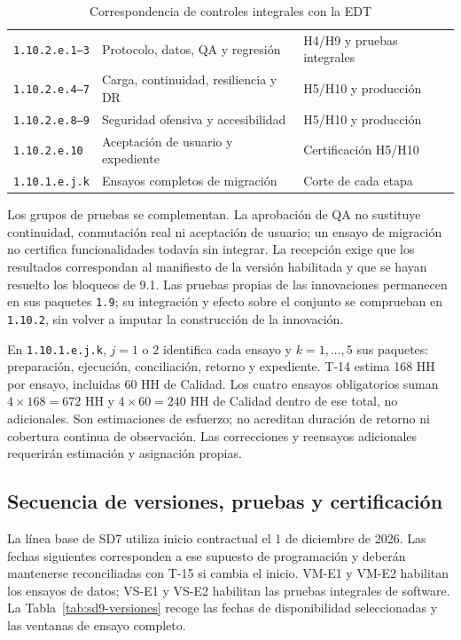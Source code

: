 \begin{table}[htbp]
\centering
\caption{Correspondencia de controles integrales con la EDT}
\label{tab:sd9-edt-calidad}
\small
\begin{tabularx}{\textwidth}{L{.22\textwidth}Y L{.26\textwidth}}
\hline
{} &  &  \\\hline
\texttt{1.10.2.e.1--3} & Protocolo, datos, QA y regresión & H4/H9 y pruebas integrales \\\hline
\texttt{1.10.2.e.4--7} & Carga, continuidad, resiliencia y DR & H5/H10 y producción \\\hline
\texttt{1.10.2.e.8--9} & Seguridad ofensiva y accesibilidad & H5/H10 y producción \\\hline
\texttt{1.10.2.e.10} & Aceptación de usuario y expediente & Certificación H5/H10 \\\hline
\texttt{1.10.1.e.j.k} & Ensayos completos de migración & Corte de cada etapa \\\hline
\end{tabularx}
\end{table}

Los grupos de pruebas se complementan. La aprobación de QA no sustituye continuidad, conmutación real ni aceptación de usuario; un ensayo de migración no certifica funcionalidades todavía sin integrar. La recepción exige que los resultados correspondan al manifiesto de la versión habilitada y que se hayan resuelto los bloqueos de 9.1. Las pruebas propias de las innovaciones permanecen en sus paquetes \texttt{1.9}; su integración y efecto sobre el conjunto se comprueban en \texttt{1.10.2}, sin volver a imputar la construcción de la innovación.

En \texttt{1.10.1.e.j.k}, $j=1$ o $2$ identifica cada ensayo y $k=1,\ldots,5$ sus paquetes: preparación, ejecución, conciliación, retorno y expediente. T-14 estima 168 HH por ensayo, incluidas 60 HH de Calidad. Los cuatro ensayos obligatorios suman $4\times168=672$ HH y $4\times60=240$ HH de Calidad dentro de ese total, no adicionales. Son estimaciones de esfuerzo; no acreditan duración de retorno ni cobertura continua de observación. Las correcciones y reensayos adicionales requerirán estimación y asignación propias. \parencite[Ensayos completos y recepción previa a los cortes]{sd9-t14}

\subsection{Secuencia de versiones, pruebas y certificación}
La línea base de SD7 utiliza inicio contractual el 1 de diciembre de 2026. Las fechas siguientes corresponden a ese supuesto de programación y deberán mantenerse reconciliadas con T-15 si cambia el inicio. VM-E1 y VM-E2 habilitan los ensayos de datos; VS-E1 y VS-E2 habilitan las pruebas integrales de software. La Tabla~\ref{tab:sd9-versiones} recoge las fechas de disponibilidad seleccionadas y las ventanas de ensayo completo. \parencite[Ensayos completos y recepción previa a los cortes]{sd9-t14}

